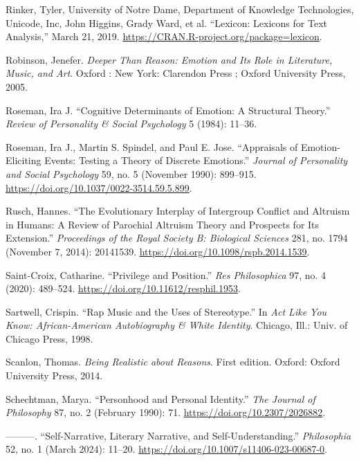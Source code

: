 \documentclass[
  12pt,
]{book}
\newlength{\cslhangindent}
\newenvironment{CSLReferences}[2] %
 {\begin{list}{}{%
  \setlength{\itemindent}{0pt}
  \setlength{\leftmargin}{0pt}
  \setlength{\parsep}{0pt}
  \ifodd #1
   \setlength{\leftmargin}{\cslhangindent}
   \setlength{\itemindent}{-1\cslhangindent}
  \fi
  \setlength{\itemsep}{#2\baselineskip}}}
 {\end{list}}
\theoremstyle{definition}
\theoremstyle{definition}
\theoremstyle{definition}
\theoremstyle{definition}
\theoremstyle{remark}
\begin{document}
\begin{CSLReferences}{1}{0}
Rinker, Tyler, University of Notre Dame, Department of Knowledge Technologies, Unicode, Inc, John Higgins, Grady Ward, et al. {``Lexicon: {Lexicons} for {Text Analysis},''} March 21, 2019. \url{https://CRAN.R-project.org/package=lexicon}.

Robinson, Jenefer. \emph{Deeper Than Reason: Emotion and Its Role in Literature, Music, and Art}. Oxford : New York: Clarendon Press ; Oxford University Press, 2005.

Roseman, Ira J. {``Cognitive Determinants of Emotion: {A} Structural Theory.''} \emph{Review of Personality \& Social Psychology} 5 (1984): 11--36.

Roseman, Ira J., Martin S. Spindel, and Paul E. Jose. {``Appraisals of Emotion-Eliciting Events: {Testing} a Theory of Discrete Emotions.''} \emph{Journal of Personality and Social Psychology} 59, no. 5 (November 1990): 899--915. \url{https://doi.org/10.1037/0022-3514.59.5.899}.

Rusch, Hannes. {``The Evolutionary Interplay of Intergroup Conflict and Altruism in Humans: A Review of Parochial Altruism Theory and Prospects for Its Extension.''} \emph{Proceedings of the Royal Society B: Biological Sciences} 281, no. 1794 (November 7, 2014): 20141539. \url{https://doi.org/10.1098/rspb.2014.1539}.

Saint-Croix, Catharine. {``Privilege and {Position}.''} \emph{Res Philosophica} 97, no. 4 (2020): 489--524. \url{https://doi.org/10.11612/resphil.1953}.

Sartwell, Crispin. {``Rap {Music} and the {Uses} of {Stereotype}.''} In \emph{Act Like You Know: {African-American} Autobiography \& White Identity}. Chicago, Ill.: Univ. of Chicago Press, 1998.

Scanlon, Thomas. \emph{Being Realistic about Reasons}. First edition. Oxford: Oxford University Press, 2014.

Schechtman, Marya. {``Personhood and {Personal Identity}.''} \emph{The Journal of Philosophy} 87, no. 2 (February 1990): 71. \url{https://doi.org/10.2307/2026882}.

---------. {``Self-{Narrative}, {Literary Narrative}, and {Self-Understanding}.''} \emph{Philosophia} 52, no. 1 (March 2024): 11--20. \url{https://doi.org/10.1007/s11406-023-00687-0}.


\end{CSLReferences}
\end{document}
